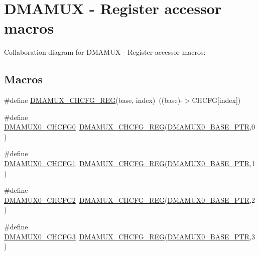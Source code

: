 \hypertarget{group___d_m_a_m_u_x___register___accessor___macros}{}\section{D\+M\+A\+M\+UX -\/ Register accessor macros}
\label{group___d_m_a_m_u_x___register___accessor___macros}
Collaboration diagram for D\+M\+A\+M\+UX -\/ Register accessor macros\+:
\subsection*{Macros}
\begin{DoxyCompactItemize}
\item 
\#define \hyperlink{group___d_m_a_m_u_x___register___accessor___macros_ga246b1b8df42388bb02a10a8c043f3f4b}{D\+M\+A\+M\+U\+X\+\_\+\+C\+H\+C\+F\+G\+\_\+\+R\+EG}(base,  index)~((base)-\/$>$C\+H\+C\+FG\mbox{[}index\mbox{]})
\item 
\#define \hyperlink{group___d_m_a_m_u_x___register___accessor___macros_gafbdd08eec205390f76af0e1e2aa323cf}{D\+M\+A\+M\+U\+X0\+\_\+\+C\+H\+C\+F\+G0}~\hyperlink{group___d_m_a_m_u_x___register___accessor___macros_ga246b1b8df42388bb02a10a8c043f3f4b}{D\+M\+A\+M\+U\+X\+\_\+\+C\+H\+C\+F\+G\+\_\+\+R\+EG}(\hyperlink{group___d_m_a_m_u_x___peripheral_ga403b61d306820e4e1113c636300004a3}{D\+M\+A\+M\+U\+X0\+\_\+\+B\+A\+S\+E\+\_\+\+P\+TR},0)
\item 
\#define \hyperlink{group___d_m_a_m_u_x___register___accessor___macros_ga8c0edd8cf3e5d5f046ceb4df69c8724b}{D\+M\+A\+M\+U\+X0\+\_\+\+C\+H\+C\+F\+G1}~\hyperlink{group___d_m_a_m_u_x___register___accessor___macros_ga246b1b8df42388bb02a10a8c043f3f4b}{D\+M\+A\+M\+U\+X\+\_\+\+C\+H\+C\+F\+G\+\_\+\+R\+EG}(\hyperlink{group___d_m_a_m_u_x___peripheral_ga403b61d306820e4e1113c636300004a3}{D\+M\+A\+M\+U\+X0\+\_\+\+B\+A\+S\+E\+\_\+\+P\+TR},1)
\item 
\#define \hyperlink{group___d_m_a_m_u_x___register___accessor___macros_gaa1b0bee7c4b71acced055cef09768a29}{D\+M\+A\+M\+U\+X0\+\_\+\+C\+H\+C\+F\+G2}~\hyperlink{group___d_m_a_m_u_x___register___accessor___macros_ga246b1b8df42388bb02a10a8c043f3f4b}{D\+M\+A\+M\+U\+X\+\_\+\+C\+H\+C\+F\+G\+\_\+\+R\+EG}(\hyperlink{group___d_m_a_m_u_x___peripheral_ga403b61d306820e4e1113c636300004a3}{D\+M\+A\+M\+U\+X0\+\_\+\+B\+A\+S\+E\+\_\+\+P\+TR},2)
\item 
\#define \hyperlink{group___d_m_a_m_u_x___register___accessor___macros_ga91901af15d28d4df4369689afa83ed91}{D\+M\+A\+M\+U\+X0\+\_\+\+C\+H\+C\+F\+G3}~\hyperlink{group___d_m_a_m_u_x___register___accessor___macros_ga246b1b8df42388bb02a10a8c043f3f4b}{D\+M\+A\+M\+U\+X\+\_\+\+C\+H\+C\+F\+G\+\_\+\+R\+EG}(\hyperlink{group___d_m_a_m_u_x___peripheral_ga403b61d306820e4e1113c636300004a3}{D\+M\+A\+M\+U\+X0\+\_\+\+B\+A\+S\+E\+\_\+\+P\+TR},3)

\end{DoxyCompactItemize}
